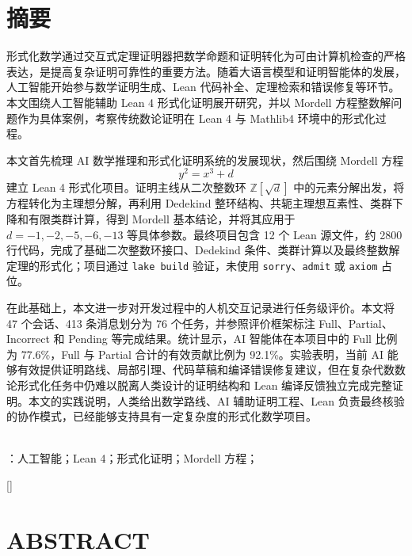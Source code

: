 \section*{摘\quad 要}

形式化数学通过交互式定理证明器把数学命题和证明转化为可由计算机检查的严格表达，是提高复杂证明可靠性的重要方法。随着大语言模型和证明智能体的发展，人工智能开始参与数学证明生成、Lean 代码补全、定理检索和错误修复等环节。本文围绕人工智能辅助 Lean 4 形式化证明展开研究，并以 Mordell 方程整数解问题作为具体案例，考察传统数论证明在 Lean 4 与 Mathlib4 环境中的形式化过程。

本文首先梳理 AI 数学推理和形式化证明系统的发展现状，然后围绕 Mordell 方程
\[
y^2=x^3+d
\]
建立 Lean 4 形式化项目。证明主线从二次整数环 $\mathbb{Z}[\sqrt d]$ 中的元素分解出发，将方程转化为主理想分解，再利用 Dedekind 整环结构、共轭主理想互素性、类群下降和有限类群计算，得到 Mordell 基本结论，并将其应用于 $d=-1,-2,-5,-6,-13$ 等具体参数。最终项目包含 12 个 Lean 源文件，约 2800 行代码，完成了基础二次整数环接口、Dedekind 条件、类群计算以及最终整数解定理的形式化；项目通过 \texttt{lake build} 验证，未使用 \texttt{sorry}、\texttt{admit} 或 \texttt{axiom} 占位。

在此基础上，本文进一步对开发过程中的人机交互记录进行任务级评价。本文将 47 个会话、413 条消息划分为 76 个任务，并参照评价框架标注 Full、Partial、Incorrect 和 Pending 等完成结果。统计显示，AI 智能体在本项目中的 Full 比例为 77.6\%，Full 与 Partial 合计的有效贡献比例为 92.1\%。实验表明，当前 AI 能够有效提供证明路线、局部引理、代码草稿和编译错误修复建议，但在复杂代数数论形式化任务中仍难以脱离人类设计的证明结构和 Lean 编译反馈独立完成完整证明。本文的实践说明，人类给出数学路线、AI 辅助证明工程、Lean 负责最终核验的协作模式，已经能够支持具有一定复杂度的形式化数学项目。

~\\
：人工智能；Lean 4；形式化证明；Mordell 方程；

\newpage
{}
[]
\section*{ABSTRACT}
\setmainfont{Times New Roman}

